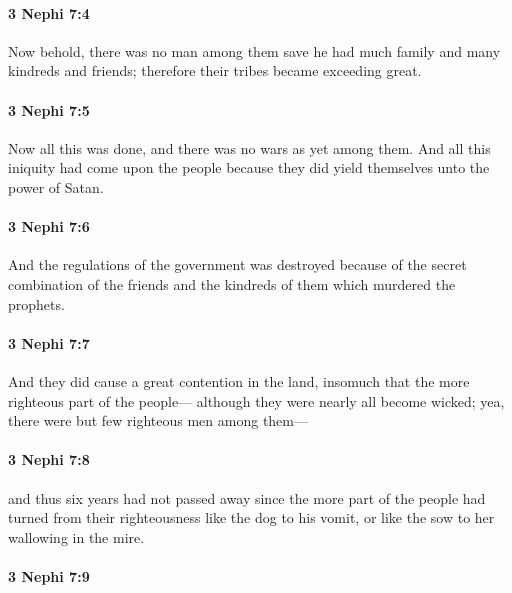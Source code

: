 		\paragraph{3 Nephi 7:4} %
			\label{3NEPHI-7-4}

			Now behold, there was no man among them
			save he had much family and many kindreds and friends;
			therefore their tribes became exceeding great.

		\paragraph{3 Nephi 7:5} %
			\label{3NEPHI-7-5}

			Now all this was done, and there was no wars as yet among them.
			And all this iniquity had come upon the people
			because they did yield themselves unto the power of Satan.

		\paragraph{3 Nephi 7:6} %
			\label{3NEPHI-7-6}

			And the regulations of the government was destroyed
			because of the secret combination of the friends and the kindreds of them
			which murdered the prophets.

		\paragraph{3 Nephi 7:7} %
			\label{3NEPHI-7-7}

			And they did cause a great contention in the land,
			insomuch that the more righteous part of the people---
			although they were nearly all become wicked;
			yea, there were but few righteous men among them---

		\paragraph{3 Nephi 7:8} %
			\label{3NEPHI-7-8}

			and thus six years had not passed away
			since the more part of the people had turned from their righteousness
			like the dog to his vomit,
			or like the sow to her wallowing in the mire.

		\paragraph{3 Nephi 7:9} %
			\label{3NEPHI-7-9}

